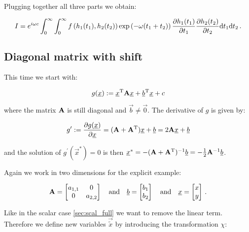 \documentclass[a4paper,10pt]{article}
\begin{document}
Plugging together all three parts we obtain:

\begin{equation}
 I = e^{i \omega c}
     \int_0^\infty \int_0^\infty
       f\left(h_1(t_1), h_2(t_2)\right)
       \exp\left(-\omega (t_1 + t_2)\right)
       \frac{\partial h_1(t_1)}{\partial t_1}
       \frac{\partial h_2(t_2)}{\partial t_2}
     \mathrm{d}t_1 \mathrm{d}t_2 \,.
\end{equation}


\subsection{Diagonal matrix with shift}
\label{sec:mv_diag}


This time we start with:

\begin{equation}
 g(\underline{x}) := \underline{x}{}^{\textnormal{T}} \mathbf{A} \underline{x} + \underline{b}{}^{\textnormal{T}} \underline{x} + c
\end{equation}

where the matrix $\mathbf{A}$ is still diagonal and $\vec{b} \neq \vec{0}$.
The derivative of $g$ is given by:

\begin{equation}
 g^\prime := \frac{\partial g(\underline{x})}{\partial \underline{x}} = (\mathbf{A}+\mathbf{A}{}^{\textnormal{T}}) \underline{x} + \underline{b} = 2 \mathbf{A} \underline{x} + \underline{b}
\end{equation}

and the solution of $g^\prime(\vec{x}^{*}) = 0$ is then
$\underline{x}^{*} = -(\mathbf{A}+\mathbf{A}{}^{\textnormal{T}}){}^{-1} \underline{b} = -\frac{1}{2}\mathbf{A}{}^{-1} \underline{b}$.

Again we work in two dimensions for the explicit example:

\begin{equation}
 \mathbf{A} =
 \begin{bmatrix}
  a_{1,1} & 0 \\ 0 & a_{2,2}
 \end{bmatrix}
 \quad \mathrm{and} \quad
 \underline{b} =
 \begin{bmatrix}
  b_1 \\ b_2
 \end{bmatrix}
 \quad \mathrm{and} \quad
 \underline{x} =
 \begin{bmatrix}
  x \\ y
 \end{bmatrix} \,.
\end{equation}

Like in the scalar case \ref{sec:scal_full} we want to remove the linear term.
Therefore we define new variables $\vec{\tilde{x}}$ by introducing the transformation
$\chi$:
\end{document}
